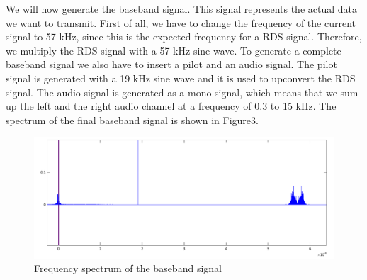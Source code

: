 \documentclass[sigconf]{acmart}
\begin{document}
We will now generate the baseband signal. This signal represents the
actual data we want to transmit. First of all, we have to change the
frequency of the current signal to 57 kHz, since this is the expected
frequency for a RDS signal. Therefore, we multiply the RDS signal with a
57 kHz sine wave. To generate a complete baseband signal we also have to
insert a pilot and an audio signal. The pilot signal is generated with a
19 kHz sine wave and it is used to upconvert the RDS signal. The audio
signal is generated as a mono signal, which means that we sum up the
left and the right audio channel at a frequency of 0.3 to 15 kHz. The
spectrum of the final baseband signal is shown in Figure3.

\begin{figure}[tb!]
	\includegraphics[width=1\linewidth]{baseband_spectrum2.png}
	\caption{Frequency spectrum of the baseband signal}
	\label{fig:rds_filt_plot}
\end{figure}
\end{document}
